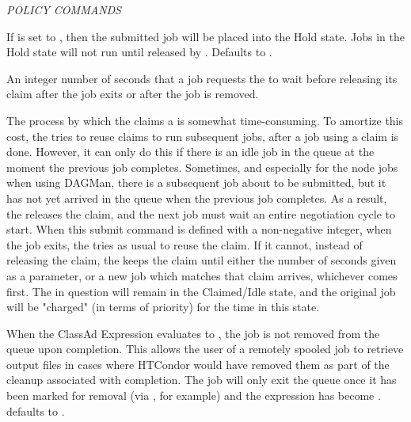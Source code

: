 \emph{POLICY COMMANDS}
\begin{description} 


\label{man-condor-submit-hold}
\item[hold = $<$True \Bar\ False$>$] 
If  is set to
, then the submitted job will be placed into the Hold state.
Jobs in the Hold state will not run until released by .
Defaults to .


\label{condor-submit-keep-claim-idle}
\item[keep\_claim\_idle = $<$integer$>$] 
An integer number of seconds
that a job requests the  to wait before releasing its
claim after the job exits or after the job is removed.

The process by which the 
 claims a  is somewhat time-consuming.
To amortize this cost, the  tries to reuse claims
to run subsequent jobs, after a job using a claim is done.  
However,
it can only do this if there is an idle job in the queue at the moment
the previous job completes.
Sometimes, and especially for the node jobs when using DAGMan,
there is a subsequent job about to be submitted, 
but it has not yet arrived in the queue when the previous job completes.
As a result, the  releases the claim,
and the next job must wait an entire negotiation cycle to start.
When this submit command is defined with a non-negative integer,
when the job exits, the  tries as usual to reuse the claim.
If it cannot, instead of releasing the claim,
the  keeps the claim until either the number of seconds given
as a parameter, or a new job which matches that claim arrives, 
whichever comes first.  
The  in question will remain in the Claimed/Idle state,
and the original job will be "charged" (in terms of priority) for the time
in this state.


\label{condor-submit-leave-in-queue}
\item[leave\_in\_queue = $<$ClassAd Boolean Expression$>$]
When the ClassAd Expression evaluates to , the job is
not removed from the queue upon completion.
This allows the user of a remotely spooled job to retrieve output
files in cases where HTCondor would have removed them as part of
the cleanup associated with completion. The job will only exit
the queue once it has been marked for removal (via ,
for example) and the  expression has
become .
 defaults to .


\end{description}
